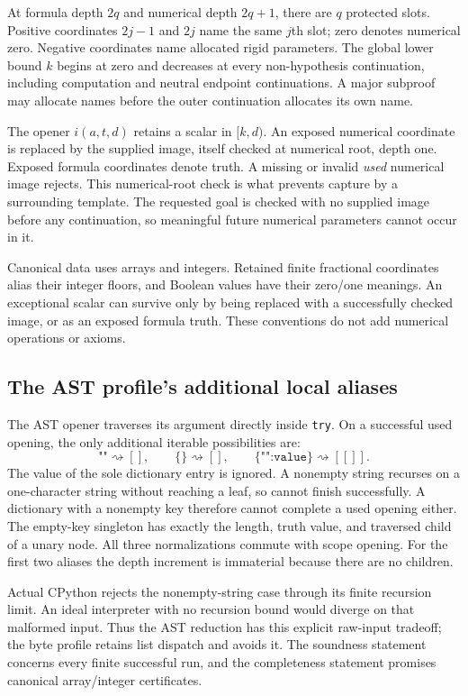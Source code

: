 At formula depth $2q$ and numerical depth $2q+1$, there are $q$ protected
slots. Positive coordinates $2j-1$ and $2j$ name the same $j$th slot;
zero denotes numerical zero. Negative coordinates name allocated rigid
parameters. The global lower bound $k$ begins at zero and decreases at
every non-hypothesis continuation, including computation and neutral
endpoint continuations. A major subproof may allocate names before the
outer continuation allocates its own name.

The opener $i(a,t,d)$ retains a scalar in $[k,d)$. An exposed numerical
coordinate is replaced by the supplied image, itself checked at numerical
root, depth one. Exposed formula coordinates denote truth. A missing or
invalid \emph{used} numerical image rejects. This numerical-root check is
what prevents capture by a surrounding template. The requested goal is
checked with no supplied image before any continuation, so meaningful
future numerical parameters cannot occur in it.

Canonical data uses arrays and integers. Retained finite fractional
coordinates alias their integer floors, and Boolean values have their
zero/one meanings. An exceptional scalar can survive only by being
replaced with a successfully checked image, or as an exposed formula
truth. These conventions do not add numerical operations or axioms.

\subsection{The AST profile's additional local aliases}

The AST opener traverses its argument directly inside \texttt{try}.
On a successful used opening, the only additional iterable possibilities
are:
\[
 \texttt{""}\rightsquigarrow[],\qquad
 \texttt{\{\}}\rightsquigarrow[],\qquad
 \texttt{\{"":value\}}\rightsquigarrow[[]].
\]
The value of the sole dictionary entry is ignored. A nonempty string
recurses on a one-character string without reaching a leaf, so cannot
finish successfully. A dictionary with a nonempty key therefore cannot
complete a used opening either. The empty-key singleton has exactly the
length, truth value, and traversed child of a unary node. All three
normalizations commute with scope opening. For the first two aliases the
depth increment is immaterial because there are no children.

Actual CPython rejects the nonempty-string case through its finite
recursion limit. An ideal interpreter with no recursion bound would
diverge on that malformed input. Thus the AST reduction has this explicit
raw-input tradeoff; the byte profile retains list dispatch and avoids it.
The soundness statement concerns every finite successful run, and the
completeness statement promises canonical array/integer certificates.

